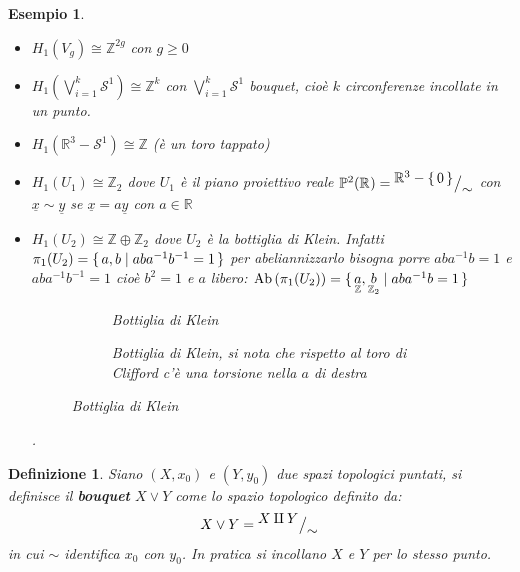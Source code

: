 \documentclass[10pt, twoside=false, x11names]{scrbook}
\newtheorem{definition}[theorem]{Definizione}
\newtheorem{example}[theorem]{Esempio}
\newcommand{\Z}{\mathbb{Z}}
\newcommand{\RN}[1][]{\mathbb{R}^#1}
\newcommand{\Sph}[1][]{\mathcal{S}^#1}
\newcommand{\Ab}[1]{\mathrm{Ab}\left( #1 \right)}
\newcommand{\invamalg}{\mathbin{\text{\rotatebox[origin=c]{180}{$\Pi$}}}}
\newcommand*\quot[2]{{^{\textstyle #1}\big/_{\textstyle #2}}}
\renewcommand{\vec}[1]{\underline{#1}}
\let\setminus-
\begin{document}
\begin{example} \hfill
  \begin{itemize}
  \item $ H_1(V_g) \cong \Z^{2g} $ con $ g \geq 0 $
  \item $ H_1(\bigvee_{i=1}^{k}\Sph{1}) \cong \Z^k $ con $ \bigvee_{i=1}^{k}\Sph{1} $ bouquet, cioè $ k $ circonferenze incollate in un punto.
  \item $ H_1(\RN{3} \setminus \Sph{1}) \cong \Z $ (è un toro tappato)
  \item $ H_1(U_1) \cong \Z_2 $ dove $ U_1 $ è il piano proiettivo reale $ \mathbb{P}^2(\RN{}) = \quot{\RN{3} \setminus \set{0}}{\sim} $
    con $ \vec{x} \sim \vec{y} $ se $ \vec{x} = a \vec{y} $ con $ a \in \RN{} $
  \item $ H_1(U_2) \cong \Z \oplus \Z_2 $ dove $ U_2 $ è la bottiglia di Klein.
    Infatti $ \pi_1(U_2) = \set{a, b | aba^{-1}b^{-1} = 1} $ per abeliannizzarlo bisogna
    porre $ aba^{-1}b = 1 $ e $ aba^{-1}b^{-1} = 1 $ cioè $ b^2 = 1 $ e $ a $ libero:
    $ \Ab{\pi_1(U_2)} = \set{\underset{\Z}{a}, \underset{\Z_2}{b} |  aba^{-1}b = 1 } $
    \begin{figure}[htbp]
      \centering
      \begin{subfigure}{.5\textwidth}
        \centering
        \def\svgwidth{0.26\textwidth}
        
        \caption{Bottiglia di Klein}
      \end{subfigure}%
      \begin{subfigure}{.5\textwidth}
        \centering
        \caption{Bottiglia di Klein, si nota che rispetto al toro di Clifford c'è
          una torsione nella $ a $ di destra}
      \end{subfigure}
      \caption{Bottiglia di Klein}
      \label{fig:lez3:klein_bottle}
    \end{figure}.
  \end{itemize}
\end{example}

\begin{definition}
  Siano $ (X,x_0) $ e $ (Y,y_0) $ due spazi topologici puntati, si definisce il \textbf{bouquet}
  $ X \vee Y $ come lo spazio topologico definito da:
  \[
    X \vee Y = \quot{X \invamalg Y}{\sim}
  \]
  in cui $ \sim $ identifica $ x_0 $ con $ y_0 $. In pratica si incollano $ X $ e $ Y $ per lo stesso punto.
\end{definition}
\end{document}
